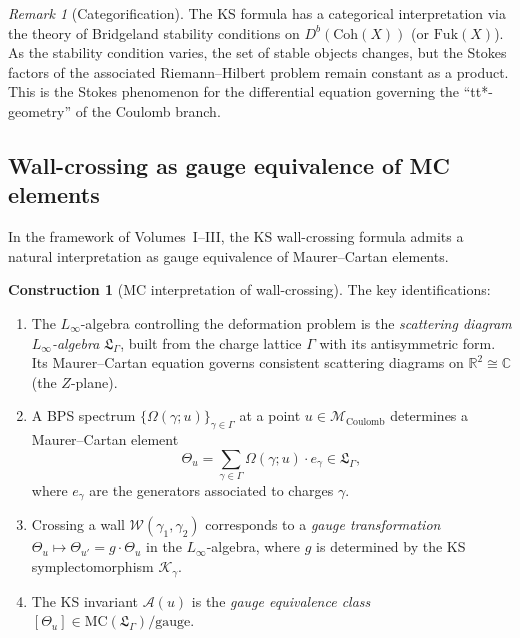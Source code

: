 \documentclass[11pt]{article}
\theoremstyle{definition}
\newtheorem{construction}[theorem]{Construction}
\theoremstyle{remark}
\newtheorem{remark}[theorem]{Remark}
\newcommand{\cM}{\mathcal{M}}
\newcommand{\cW}{\mathcal{W}}
\newcommand{\Fuk}{\mathrm{Fuk}}
\newcommand{\Coh}{\mathrm{Coh}}
\newcommand{\Coulomb}{\mathrm{Coulomb}}
\begin{document}
\begin{remark}[Categorification]
 \label{rem:ks-categorification}
 The KS formula has a categorical interpretation via the theory of Bridgeland stability conditions
 on $D^b(\Coh(X))$ (or $\Fuk(X)$). As the stability condition varies, the set of stable objects
 changes, but the Stokes factors of the associated Riemann--Hilbert problem remain constant
 as a product. This is the Stokes phenomenon for the differential equation governing the
 ``tt*-geometry'' of the Coulomb branch.
\end{remark}

\subsection{Wall-crossing as gauge equivalence of MC elements}
\label{subsec:wc-mc}

In the framework of Volumes~I--III, the KS wall-crossing formula admits a natural interpretation
as gauge equivalence of Maurer--Cartan elements.

\begin{construction}[MC interpretation of wall-crossing]
 \label{constr:mc-wall-crossing}
 The key identifications:
 \begin{enumerate}[label=(\roman*)]
 \item The $L_\infty$-algebra controlling the deformation problem is the \emph{scattering diagram
 $L_\infty$-algebra} $\mathfrak{L}_\Gamma$, built from the charge lattice $\Gamma$ with its
 antisymmetric form. Its Maurer--Cartan equation governs consistent scattering diagrams on
 $\mathbb{R}^2 \cong \mathbb{C}$ (the $Z$-plane).
 \item A BPS spectrum $\{\Omega(\gamma; u)\}_{\gamma \in \Gamma}$ at a point $u \in
 \cM_{\Coulomb}$ determines a Maurer--Cartan element
 \begin{equation}
 \label{eq:theta-bps}
 \Theta_u = \sum_{\gamma \in \Gamma} \Omega(\gamma; u) \cdot e_\gamma \in \mathfrak{L}_\Gamma,
 \end{equation}
 where $e_\gamma$ are the generators associated to charges $\gamma$.
 \item Crossing a wall $\cW(\gamma_1, \gamma_2)$ corresponds to a \emph{gauge transformation}
 $\Theta_u \mapsto \Theta_{u'} = g \cdot \Theta_u$ in the $L_\infty$-algebra, where $g$ is
 determined by the KS symplectomorphism $\mathcal{K}_\gamma$.
 \item The KS invariant $\mathcal{A}(u)$ is the \emph{gauge equivalence class}
 $[\Theta_u] \in \mathrm{MC}(\mathfrak{L}_\Gamma) / \mathrm{gauge}$.
 \end{enumerate}
\end{construction}
\end{document}
